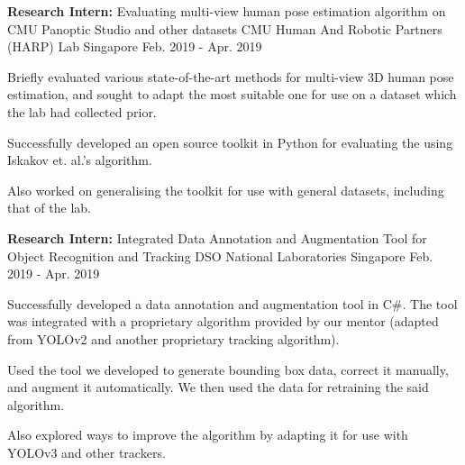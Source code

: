 \begin{cventries}
\cventry
{
	\textbf{Research Intern:}  Evaluating multi-view human pose estimation algorithm on CMU Panoptic Studio and other datasets  
} %
{CMU Human And Robotic Partners (HARP) Lab} %
{Singapore} %
{Feb. 2019 - Apr. 2019} %
{ %
	\begin{cvitems}
		\item { Briefly evaluated various state-of-the-art methods for multi-view 3D human pose estimation, and sought to adapt the most suitable one for use on a dataset which the lab had collected prior.}
		\item { Successfully developed an open source toolkit in Python for evaluating the  using Iskakov et. al.'s   algorithm.}
		\item { Also worked on generalising the toolkit for use with general datasets, including that of the lab.}
	\end{cvitems}
}


\label{computerVisionProjectDSO}

\cventry
{
	\textbf{Research Intern:} Integrated Data Annotation and Augmentation Tool for Object Recognition and Tracking
} %
{DSO National Laboratories} %
{Singapore} %
{Feb. 2019 - Apr. 2019} %
{ %
	\begin{cvitems}
		\item { Successfully developed a data annotation and augmentation tool in C\#. The tool was integrated with a proprietary algorithm provided by our mentor (adapted from YOLOv2 and another proprietary tracking algorithm).}
		\item { Used the tool we developed to generate bounding box data, correct it manually, and augment it automatically. We then used the data for retraining the said algorithm.}
		\item { Also explored ways to improve the algorithm by adapting it for use with YOLOv3 and other trackers.}
	\end{cvitems}
}


\end{cventries}
